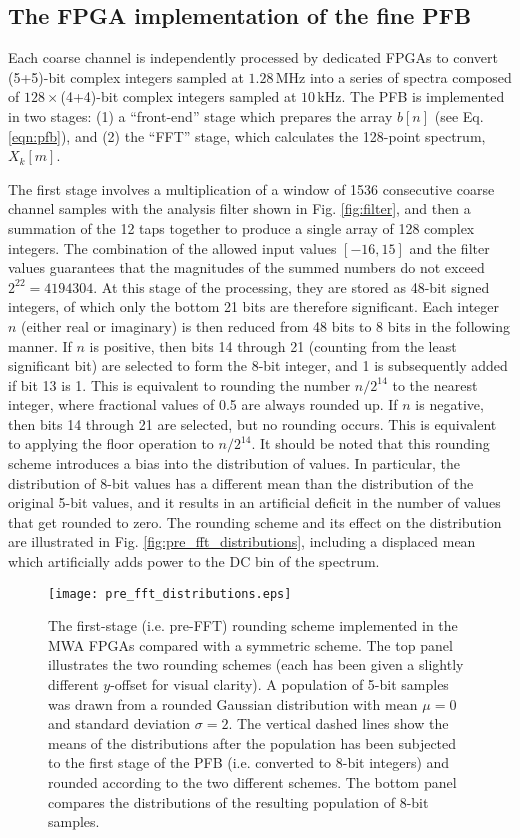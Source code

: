 \documentclass{pasa}%
\begin{document}
\begin{appendix}

\section{The FPGA implementation of the fine PFB}

Each coarse channel is independently processed by dedicated FPGAs to convert (5+5)-bit complex integers sampled at $1.28\,$MHz into a series of spectra composed of $128\times$(4+4)-bit complex integers sampled at $10\,$kHz.
The PFB is implemented in two stages: (1) a ``front-end'' stage which prepares the array $b[n]$ (see Eq. \eqref{eqn:pfb}), and (2) the ``FFT'' stage, which calculates the 128-point spectrum, $X_k[m]$.

The first stage involves a multiplication of a window of 1536 consecutive coarse channel samples with the analysis filter shown in Fig. \ref{fig:filter}, and then a summation of the 12 taps together to produce a single array of 128 complex integers.
The combination of the allowed input values $[-16, 15]$ and the filter values guarantees that the magnitudes of the summed numbers do not exceed $2^{22} = 4194304$.
At this stage of the processing, they are stored as 48-bit signed integers, of which only the bottom 21 bits are therefore significant.
Each integer $n$ (either real or imaginary) is then reduced from 48 bits to 8 bits in the following manner.
If $n$ is positive, then bits 14 through 21 (counting from the least significant bit) are selected to form the 8-bit integer, and 1 is subsequently added if bit 13 is 1.
This is equivalent to rounding the number $n/2^{14}$ to the nearest integer, where fractional values of 0.5 are always rounded up.
If $n$ is negative, then bits 14 through 21 are selected, but no rounding occurs.
This is equivalent to applying the floor operation to $n/2^{14}$.
It should be noted that this rounding scheme introduces a bias into the distribution of values.
In particular, the distribution of 8-bit values has a different mean than the distribution of the original 5-bit values, and it results in an artificial deficit in the number of values that get rounded to zero.
The rounding scheme and its effect on the distribution are illustrated in Fig. \ref{fig:pre_fft_distributions}, including a displaced mean which artificially adds power to the DC bin of the spectrum.
\begin{figure}[t!]
    \centering
    \texttt{[image: pre\_fft\_distributions.eps]}
    \caption{The first-stage (i.e. pre-FFT) rounding scheme implemented in the MWA FPGAs compared with a symmetric scheme. The top panel illustrates the two rounding schemes (each has been given a slightly different $y$-offset for visual clarity). A population of 5-bit samples was drawn from a rounded Gaussian distribution with mean $\mu = 0$ and standard deviation $\sigma = 2$. The vertical dashed lines show the means of the distributions after the population has been subjected to the first stage of the PFB (i.e. converted to 8-bit integers) and rounded according to the two different schemes. The bottom panel compares the distributions of the resulting population of 8-bit samples.}

\end{figure}
\end{appendix}
\end{document}
